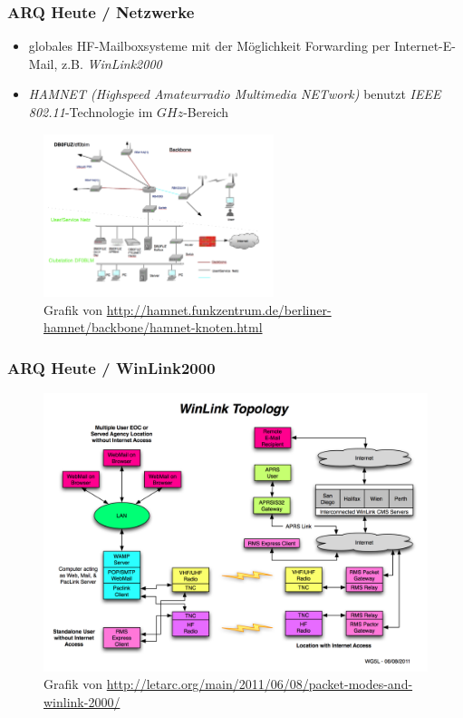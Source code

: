 \begin{frame}
  \frametitle{ARQ Heute / Netzwerke}

  \begin{itemize}
    \item globales HF-Mailboxsysteme mit der Möglichkeit Forwarding per
      Internet-E-Mail, z.B. \emph{WinLink2000}
    \item \emph{HAMNET (Highspeed Amateurradio Multimedia NETwork)} benutzt
      \emph{IEEE 802.11}-Technologie im $GHz$-Bereich
  \end{itemize}

  \begin{center}
    \begin{figure}
      \includegraphics[width=0.6\textwidth,height=.5\textheight,keepaspectratio]{e16/db0fuz.png}
      \caption{Grafik von \ExternalLink\url{http://hamnet.funkzentrum.de/berliner-hamnet/backbone/hamnet-knoten.html}}
    \end{figure}
  \end{center}

\end{frame}

\begin{frame}
  \frametitle{ARQ Heute / WinLink2000}

  \begin{center}
    \begin{figure}
      \includegraphics[width=.8\textwidth,height=.75\textheight,keepaspectratio]{e16/WinLink_Topology.jpg}
      \caption{Grafik von \ExternalLink\url{http://letarc.org/main/2011/06/08/packet-modes-and-winlink-2000/}}
    \end{figure}
  \end{center}

\end{frame}

